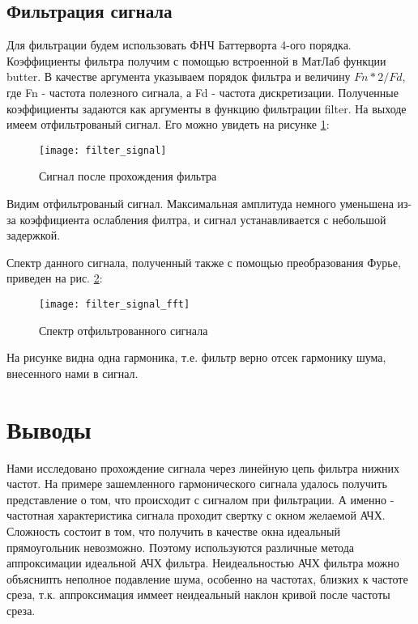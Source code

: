 \subsection{Фильтрация сигнала}
Для фильтрации будем использовать ФНЧ Баттерворта 4-ого порядка. Коэффициенты фильтра получим с помощью встроенной в МатЛаб функции butter. В качестве аргумента указываем порядок фильтра и величину $Fn*2/Fd$, где Fn - частота полезного сигнала, а Fd - частота дискретизации.
Полученные коэффициенты задаются как аргументы в функцию фильтрации filter. На выходе имеем отфильтрованый сигнал. Его можно увидеть на рисунке \ref{pic:filter_signal}:
\begin{figure}[H]
	\begin{center}
		\texttt{[image: filter\_signal]}
		\caption{Сигнал после прохождения фильтра} 
		\label{pic:filter_signal} %
	\end{center}
\end{figure}
Видим отфильтрованый сигнал. Максимальная амплитуда немного уменьшена из-за коэффициента ослабления филтра, и сигнал устанавливается с небольшой задержкой.

Спектр данного сигнала, полученный также с помощью преобразования Фурье, приведен на рис. \ref{pic:filter_signal_fft}:
\begin{figure}[H]
	\begin{center}
		\texttt{[image: filter\_signal\_fft]}
		\caption{Спектр отфильтрованного сигнала} 
		\label{pic:filter_signal_fft} %
	\end{center}
\end{figure}
На рисунке видна одна гармоника, т.е. фильтр верно отсек гармонику шума, внесенного нами в сигнал.

\section{Выводы}

Нами исследовано прохождение сигнала через линейную цепь фильтра нижних частот. На примере зашемленного гармонического сигнала удалось получить представление о том, что происходит с сигналом при фильтрации. А именно - частотная характеристика сигнала проходит свертку с окном желаемой АЧХ. Сложность состоит в том, что получить в качестве окна идеальный прямоугольник невозможно. Поэтому используются различные метода аппроксимации идеальной АЧХ фильтра. Неидеальностью АЧХ фильтра можно объяснипть неполное подавление шума, особенно на частотах, близких к частоте среза, т.к. аппроксимация иммеет неидеальный наклон кривой после частоты среза.


